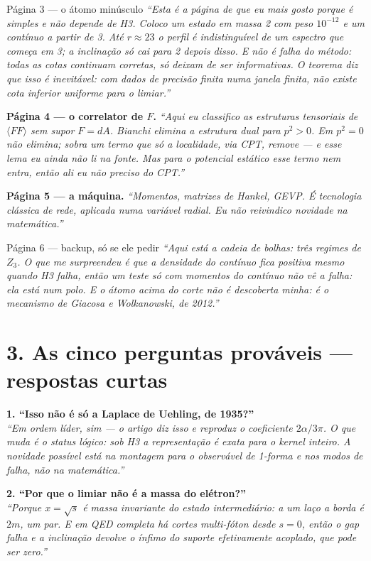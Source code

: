 \documentclass[12pt,a4paper]{article}
\newcommand{\fala}[1]{\textit{\color{ink}``#1''}}
\begin{document}
\begin{say}{Página 3 --- o átomo minúsculo}
\fala{Esta é a página de que eu mais gosto porque é simples e não depende de H3.
Coloco um estado em massa 2 com peso $10^{-12}$ e um contínuo a partir de 3.
Até $r\approx 23$ o perfil é indistinguível de um espectro que começa em 3; a
inclinação só cai para 2 depois disso. E não é falha do método: todas as cotas
continuam corretas, só deixam de ser informativas. O teorema diz que isso é
inevitável: com dados de precisão finita numa janela finita, não existe cota
inferior uniforme para o limiar.}
\end{say}

\textbf{Página 4 --- o correlator de $F$.} \fala{Aqui eu classifico as estruturas
tensoriais de $\langle FF\rangle$ sem supor $F=dA$. Bianchi elimina a estrutura
dual para $p^2>0$. Em $p^2=0$ não elimina; sobra um termo que só a localidade,
via CPT, remove --- e esse lema eu ainda não li na fonte. Mas para o potencial
estático esse termo nem entra, então ali eu não preciso do CPT.}

\textbf{Página 5 --- a máquina.} \fala{Momentos, matrizes de Hankel, GEVP.
É tecnologia clássica de rede, aplicada numa variável radial. Eu não reivindico
novidade na matemática.}

\begin{say}{Página 6 --- backup, só se ele pedir}
\fala{Aqui está a cadeia de bolhas: três regimes de $Z_3$. O que me
surpreendeu é que a densidade do contínuo fica positiva mesmo quando H3 falha,
então um teste só com momentos do contínuo não vê a falha: ela está num polo.
E o átomo acima do corte não é descoberta minha: é o mecanismo de Giacosa e
Wolkanowski, de 2012.}
\end{say}

\section*{3. As cinco perguntas prováveis --- respostas curtas}

\textbf{1. ``Isso não é só a Laplace de Uehling, de 1935?''}\\
\fala{Em ordem líder, sim --- o artigo diz isso e reproduz o coeficiente
$2\alpha/3\pi$. O que muda é o status lógico: sob H3 a representação é exata
para o kernel inteiro. A novidade possível está na montagem para o observável
de 1-forma e nos modos de falha, não na matemática.}

\textbf{2. ``Por que o limiar não é a massa do elétron?''}\\
\fala{Porque $x=\sqrt{s}$ é massa invariante do estado intermediário: a um laço
a borda é $2m$, um par. E em QED completa há cortes multi-fóton desde $s=0$,
então o gap falha e a inclinação devolve o ínfimo do suporte efetivamente
acoplado, que pode ser zero.}
\end{document}
